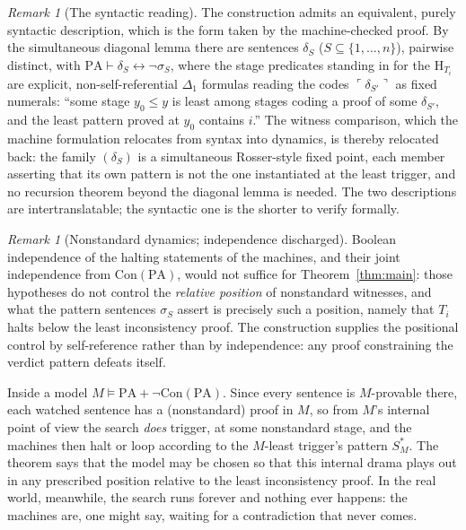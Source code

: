 \documentclass[11pt]{amsart}
\theoremstyle{definition}
\theoremstyle{remark}
\newtheorem{remark}[theorem]{Remark}
\newcommand{\PA}{\mathrm{PA}}
\newcommand{\Con}{\mathrm{Con}}
\newcommand{\HT}[1]{\mathrm{H}_{#1}}
\newcommand{\godel}[1]{\ulcorner #1 \urcorner}
\begin{document}
\begin{remark}[The syntactic reading]\label{rem:syntactic}
The construction admits an equivalent, purely syntactic description,
which is the form taken by the machine-checked proof. By the
simultaneous diagonal lemma there are sentences $\delta_S$
($S\subseteq\{1,\dots,n\}$), pairwise distinct, with
$\PA\vdash\delta_S\leftrightarrow\neg\sigma_S$, where the stage
predicates standing in for the $\HT{T_i}$ are explicit, non-self-referential
$\Delta_1$ formulas reading the codes $\godel{\delta_{S'}}$ as fixed
numerals: ``some stage $y_0\le y$ is least among stages coding a proof
of some $\delta_{S'}$, and the least pattern proved at $y_0$ contains
$i$.'' The witness comparison, which the machine formulation relocates
from syntax into dynamics, is thereby relocated back: the family
$(\delta_S)$ is a simultaneous Rosser-style fixed point, each member
asserting that its own pattern is not the one instantiated at the least
trigger, and no recursion theorem beyond the diagonal lemma is needed.
The two descriptions are intertranslatable; the syntactic one is the
shorter to verify formally.
\end{remark}

\begin{remark}[Nonstandard dynamics; independence discharged]
\label{rem:dynamics}
Boolean independence of the halting statements of the machines, and their
joint independence from $\Con(\PA)$, would not suffice for
Theorem~\ref{thm:main}: those hypotheses do not control the \emph{relative
position} of nonstandard witnesses, and what the pattern sentences $\sigma_S$
assert is precisely such a position, namely that $T_i$ halts below the least
inconsistency proof. The construction supplies the positional control by
self-reference rather than by independence: any proof constraining the verdict
pattern defeats itself.

Inside a model
$M\models\PA+\neg\Con(\PA)$. Since every sentence is $M$-provable there,
each watched sentence has a (nonstandard) proof in $M$, so from $M$'s
internal point of view the search \emph{does} trigger, at some
nonstandard stage, and the machines then halt or loop according to the
$M$-least trigger's pattern $S^*_M$. The theorem says that the model may
be chosen so that this internal drama plays out in any prescribed
position relative to the least inconsistency proof. In the real world,
meanwhile, the search runs forever and nothing ever happens: the machines
are, one might say, waiting for a contradiction that never comes.
\end{remark}
\end{document}
